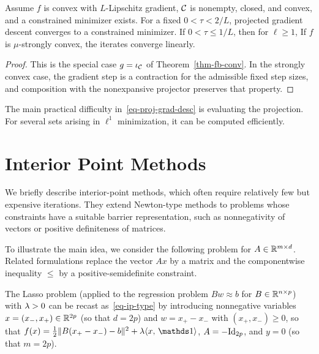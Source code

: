 \begin{thm}\label{thm-proj-grad}
Assume $f$ is convex with $L$-Lipschitz gradient, $\mathcal{C}$ is nonempty, closed, and convex, and a constrained minimizer exists. For a fixed $0<\tau<2/L$, projected gradient descent converges to a constrained minimizer. If $0<\tau\leq1/L$, then for $\ell\geq1$,
If $f$ is $\mu$-strongly convex, the iterates converge linearly.
\end{thm}
\begin{proof}
This is the special case $g=\iota_{\mathcal{C}}$ of Theorem~\ref{thm-fb-conv}. In the strongly convex case, the gradient step is a contraction for the admissible fixed step sizes, and composition with the nonexpansive projector preserves that property.
\end{proof}

The main practical difficulty in~\eqref{eq-proj-grad-desc} is evaluating the projection. For several sets arising in $\ell^1$ minimization, it can be computed efficiently.


\section{Interior Point Methods}

We briefly describe interior-point methods, which often require relatively few but expensive iterations. They extend Newton-type methods to problems whose constraints have a suitable barrier representation, such as nonnegativity of vectors or positive definiteness of matrices.


To illustrate the main idea, we consider the following problem
for $A \in \mathbb{R}^{m \times d}$.
%
Related formulations replace the vector $A x$ by a matrix and the componentwise inequality $\leq$ by a positive-semidefinite constraint.

\begin{exmp}[Lasso]
	The Lasso problem (applied to the regression problem $Bw \approx b$ for $B \in \mathbb{R}^{n \times p}$)
	with $\lambda>0$ can be recast as~\eqref{eq-ip-type} by introducing nonnegative variables
	$x=(x_-,x_+) \in \mathbb{R}^{2p}$ (so that $d=2p$)  and $w = x_+ - x_-$ with $(x_+,x_-) \geq 0$, so that 
	$f(x) = \frac{1}{2}\norm{B(x_+-x_-)-b}^2 + \la \dotp{x}{\ones}$, $A=-\mathrm{Id}_{2p}$, and $y=0$ (so that $m=2p$).
\end{exmp}

